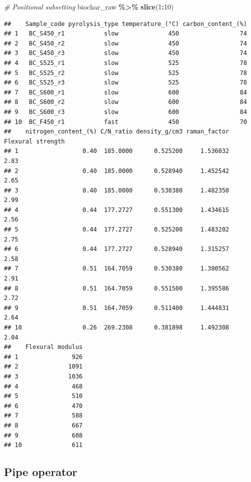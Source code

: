 \documentclass[
]{article}
\newenvironment{Shaded}{\begin{snugshade}}{\end{snugshade}}
\newcommand{\CommentTok}[1]{\textcolor[rgb]{0.56,0.35,0.01}{\textit{#1}}}
\newcommand{\DecValTok}[1]{\textcolor[rgb]{0.00,0.00,0.81}{#1}}
\newcommand{\FunctionTok}[1]{\textcolor[rgb]{0.13,0.29,0.53}{\textbf{#1}}}
\newcommand{\NormalTok}[1]{#1}
\newcommand{\SpecialCharTok}[1]{\textcolor[rgb]{0.81,0.36,0.00}{\textbf{#1}}}
\begin{document}
\begin{Shaded}
\begin{Highlighting}[]
\CommentTok{\# Positional subsetting}
\NormalTok{biochar\_raw }\SpecialCharTok{\%\textgreater{}\%} \FunctionTok{slice}\NormalTok{(}\DecValTok{1}\SpecialCharTok{:}\DecValTok{10}\NormalTok{)}
\end{Highlighting}
\end{Shaded}

\begin{verbatim}
##    Sample_code pyrolysis_type temperature_(°C) carbon_content_(%)
## 1   BC_S450_r1           slow              450                 74
## 2   BC_S450_r2           slow              450                 74
## 3   BC_S450_r3           slow              450                 74
## 4   BC_S525_r1           slow              525                 78
## 5   BC_S525_r2           slow              525                 78
## 6   BC_S525_r3           slow              525                 78
## 7   BC_S600_r1           slow              600                 84
## 8   BC_S600_r2           slow              600                 84
## 9   BC_S600_r3           slow              600                 84
## 10  BC_F450_r1           fast              450                 70
##    nitrogen_content_(%) C/N_ratio density_g/cm3 raman_factor Flexural strength
## 1                  0.40  185.0000      0.525200     1.536032              2.83
## 2                  0.40  185.0000      0.528940     1.452542              2.65
## 3                  0.40  185.0000      0.530380     1.482350              2.99
## 4                  0.44  177.2727      0.551300     1.434615              2.56
## 5                  0.44  177.2727      0.525200     1.483202              2.75
## 6                  0.44  177.2727      0.528940     1.315257              2.58
## 7                  0.51  164.7059      0.530380     1.380562              2.91
## 8                  0.51  164.7059      0.551500     1.395586              2.72
## 9                  0.51  164.7059      0.511400     1.444831              2.64
## 10                 0.26  269.2308      0.381898     1.492308              2.04
##    Flexural modulus
## 1               926
## 2              1091
## 3              1036
## 4               468
## 5               510
## 6               470
## 7               588
## 8               667
## 9               608
## 10              611
\end{verbatim}

\subsection{Pipe operator}\label{pipe-operator}
\end{document}
